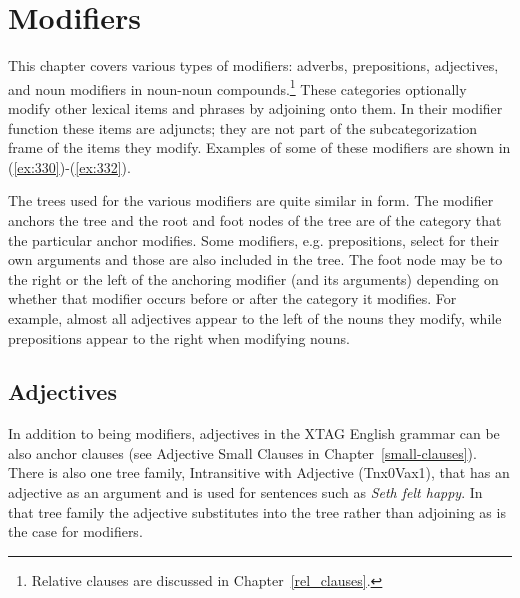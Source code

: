 \chapter{Modifiers} 
\label{modifiers} 
 
This chapter covers various types of modifiers: adverbs, prepositions, 
adjectives, and noun modifiers in noun-noun compounds.\footnote{Relative clauses are discussed in Chapter~\ref{rel_clauses}.}  These categories 
optionally modify other lexical items and phrases by adjoining onto them.  In 
their modifier function these items are adjuncts; they are not part of the 
subcategorization frame of the items they modify.  Examples of some of these 
modifiers are shown in (\ref{ex:330})-(\ref{ex:332}). 
 
\beginsentences
{}\label{ex:330} 
\endsentences

 
\beginsentences
{}\label{ex:331} 
\endsentences

 
\beginsentences
{}\label{ex:332} 
\endsentences

 
The trees used for the various modifiers are quite similar in form. 
The modifier anchors the tree and the root and foot nodes of the tree 
are of the category that the particular anchor modifies. Some 
modifiers, e.g. prepositions, select for their own arguments and those 
are also included in the tree.  The foot node may be to the right or 
the left of the anchoring modifier (and its arguments) depending on 
whether that modifier occurs before or after the category it 
modifies. For example, almost all adjectives appear to the left of the 
nouns they modify, while prepositions appear to the right when 
modifying nouns. 
 
 
\section{Adjectives} 
\label{adj-modifier} 
 
In addition to being modifiers, adjectives in the XTAG English grammar can be 
also anchor clauses (see Adjective Small Clauses in 
Chapter~\ref{small-clauses}).  There is also one tree family, Intransitive with 
Adjective (Tnx0Vax1), that has an adjective as an argument and is used for 
sentences such as {\it Seth felt happy}. In that tree family the adjective 
substitutes into the tree rather than adjoining as is the case for modifiers. 
 
